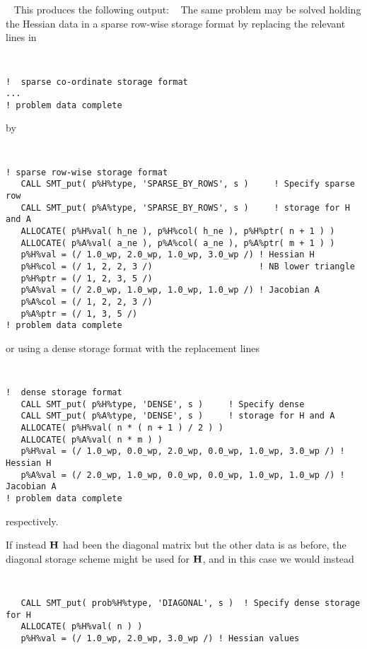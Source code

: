 \documentclass{galahad}
\begin{document}
{\tt \small
\VerbatimInput{\packageexample}
}
\noindent
This produces the following output:
{\tt \small
\VerbatimInput{\packageresults}
}
\noindent
The same problem may be solved holding the Hessian data in
a sparse row-wise storage format by replacing the relevant lines in
{\tt \small
\begin{verbatim}
!  sparse co-ordinate storage format
...
! problem data complete
\end{verbatim}
}
\noindent
by
{\tt \small
\begin{verbatim}
! sparse row-wise storage format
   CALL SMT_put( p%H%type, 'SPARSE_BY_ROWS', s )     ! Specify sparse row
   CALL SMT_put( p%A%type, 'SPARSE_BY_ROWS', s )     ! storage for H and A
   ALLOCATE( p%H%val( h_ne ), p%H%col( h_ne ), p%H%ptr( n + 1 ) )
   ALLOCATE( p%A%val( a_ne ), p%A%col( a_ne ), p%A%ptr( m + 1 ) )
   p%H%val = (/ 1.0_wp, 2.0_wp, 1.0_wp, 3.0_wp /) ! Hessian H
   p%H%col = (/ 1, 2, 2, 3 /)                     ! NB lower triangle
   p%H%ptr = (/ 1, 2, 3, 5 /)
   p%A%val = (/ 2.0_wp, 1.0_wp, 1.0_wp, 1.0_wp /) ! Jacobian A
   p%A%col = (/ 1, 2, 2, 3 /)
   p%A%ptr = (/ 1, 3, 5 /)
! problem data complete
\end{verbatim}
}
\noindent
or using a dense storage format with the replacement lines
{\tt \small
\begin{verbatim}
!  dense storage format
   CALL SMT_put( p%H%type, 'DENSE', s )     ! Specify dense
   CALL SMT_put( p%A%type, 'DENSE', s )     ! storage for H and A
   ALLOCATE( p%H%val( n * ( n + 1 ) / 2 ) )
   ALLOCATE( p%A%val( n * m ) )
   p%H%val = (/ 1.0_wp, 0.0_wp, 2.0_wp, 0.0_wp, 1.0_wp, 3.0_wp /) ! Hessian H
   p%A%val = (/ 2.0_wp, 1.0_wp, 0.0_wp, 0.0_wp, 1.0_wp, 1.0_wp /) ! Jacobian A
! problem data complete
\end{verbatim}
}
\noindent
respectively.

If instead ${\mathbf{H}}$ had been the diagonal matrix
but the other data is as before, the diagonal storage scheme
might be used for ${\mathbf{H}}$, and in this case we would instead
{\tt \small
\begin{verbatim}
   CALL SMT_put( prob%H%type, 'DIAGONAL', s )  ! Specify dense storage for H
   ALLOCATE( p%H%val( n ) )
   p%H%val = (/ 1.0_wp, 2.0_wp, 3.0_wp /) ! Hessian values
\end{verbatim}
}
\noindent
\end{document}
